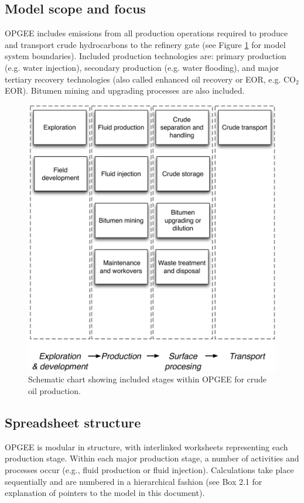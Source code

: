 \documentclass[11pt]{report}
\begin{document}
\subsection{Model scope and focus}

OPGEE includes emissions from all production operations required to produce and transport crude hydrocarbons to the refinery gate (see Figure \ref{fig:OPGEE_stages} for model system boundaries). Included production technologies are: primary production (e.g. water injection), secondary production (e.g. water flooding), and major tertiary recovery technologies (also called enhanced oil recovery or EOR, e.g. CO$_2$ EOR). Bitumen mining and upgrading processes are also included. 

\begin{figure}[t]
\includegraphics[width=0.85\columnwidth]{images/Flow_sheet_v4.pdf}
\caption{Schematic chart showing included stages within OPGEE for crude oil production.}
\label{fig:OPGEE_stages}
\end{figure}


\subsection{Spreadsheet structure}

OPGEE is modular in structure, with interlinked worksheets representing each production stage. Within each major production stage, a number of activities and processes occur (e.g., fluid production or fluid injection). Calculations take place sequentially and are numbered in a hierarchical fashion (see Box 2.1 for explanation of pointers to the model in this document). 
\end{document}
